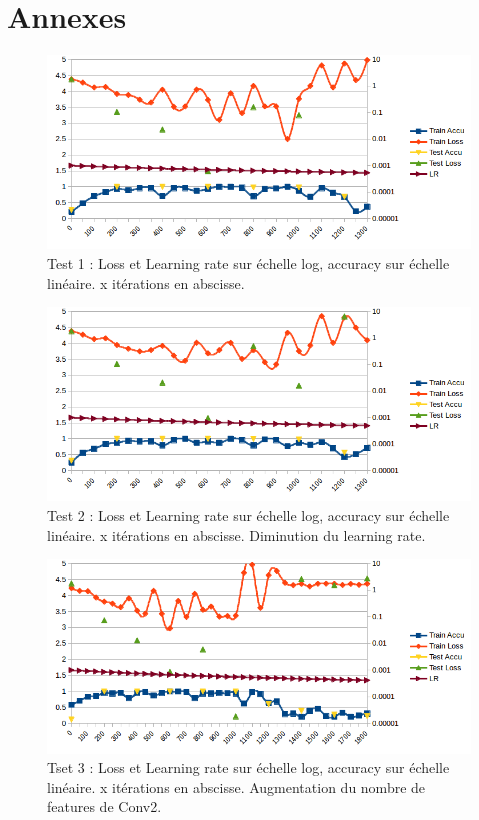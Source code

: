 \documentclass[a4paper,12pt]{article}
\begin{document}
\newpage
\section*{Annexes}

  \begin{figure}[!ht]
    \centering
    \includegraphics[keepaspectratio=true,width=430pt]{graphs/graph1.png}
    \centering
    \caption{Test 1 : Loss et Learning rate sur échelle log, accuracy sur échelle linéaire. x itérations en abscisse.}
  \end{figure}
  \begin{figure}[!ht]
    \centering
    \includegraphics[keepaspectratio=true,width=430pt]{graphs/graph2.png}
    \centering
    \caption{Test 2 : Loss et Learning rate sur échelle log, accuracy sur échelle linéaire. x itérations en abscisse. Diminution du learning rate.}
  \end{figure}
  \begin{figure}[!ht]
    \centering
    \includegraphics[keepaspectratio=true,width=430pt]{graphs/graph3.png}
    \centering
    \caption{Tset 3 : Loss et Learning rate sur échelle log, accuracy sur échelle linéaire. x itérations en abscisse. Augmentation du nombre de features de Conv2.}
  \end{figure}
\end{document}
